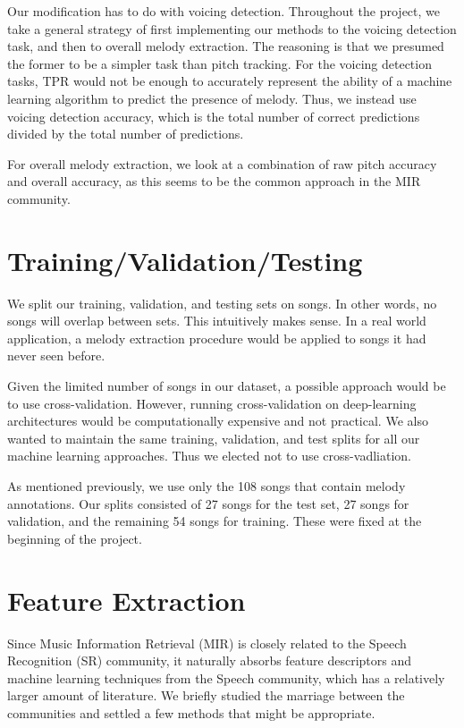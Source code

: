 \documentclass{article} %
\begin{document}
Our modification has to do with voicing detection.  Throughout the project, we take a general strategy of first implementing our methods to the voicing detection task, and then to overall melody extraction.  The reasoning is that we presumed the former to be a simpler task than pitch tracking. For the voicing detection tasks, TPR would not be enough to accurately represent the ability of a machine learning algorithm to predict the presence of melody.  Thus, we instead use voicing detection accuracy, which is the total number of correct predictions divided by the total number of predictions.

For overall melody extraction, we look at a combination of raw pitch accuracy and overall accuracy, as this seems to be the common approach in the MIR community.

\section{Training/Validation/Testing}

We split our training, validation, and testing sets on songs.  In other words, no songs will overlap between sets.  This intuitively makes sense.  In a real world application, a melody extraction procedure would be applied to songs it had never seen before. 

Given the limited number of songs in our dataset, a possible approach would be to use cross-validation.  However, running cross-validation on deep-learning architectures would be computationally expensive and not practical.  We also wanted to maintain the same training, validation, and test splits for all our machine learning approaches.  Thus we elected not to use cross-vadliation.

As mentioned previously, we use only the 108 songs that contain melody annotations.  Our splits consisted of 27 songs for the test set, 27 songs for validation, and the remaining 54 songs for training.  These were fixed at the beginning of the project.

\section{Feature Extraction}
Since Music Information Retrieval (MIR) is closely related to the Speech Recognition (SR) community, it naturally absorbs feature descriptors and 
machine learning techniques from the Speech community, which has a relatively larger amount of literature.
We briefly studied the marriage between the communities and settled a few methods that might be appropriate. 
\end{document}

